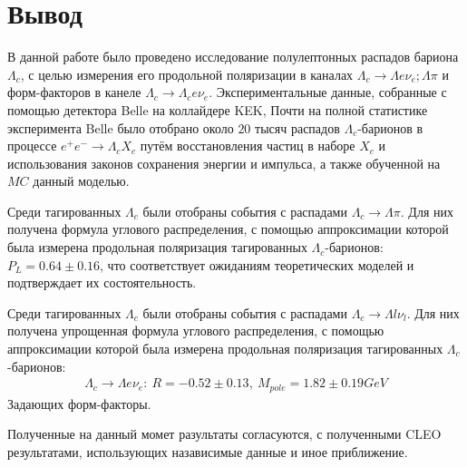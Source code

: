 \section{Вывод}

В данной работе было проведено исследование полулептонных распадов бариона $\Lambda_c$, 
с целью измерения его продольной поляризации в каналах $\Lambda_c \to \Lambda e \nu_e; \Lambda \pi$ 
и форм-факторов в канеле $\Lambda_c \to \Lambda_c e \nu_e$. 
Экспериментальные данные, собранные с помощью детектора Belle на коллайдере KEK, 
Почти на полной статистике эксперимента Belle было отобрано около
$20$ тысяч распадов $\Lambda_c$-барионов в процессе $e^+ e^- \to \Lambda_c X_c$ путём 
восстановления частиц в наборе $X_c$ и использования законов сохранения
энергии и импульса, а также обученной на $MC$ данный моделью.

Среди тагированных $\Lambda_c$ были отобраны события с распадами $\Lambda_c \to \Lambda \pi$. 
Для них получена формула углового распределения, с помощью аппроксимации которой была измерена
продольная поляризация тагированных $\Lambda_c$-барионов: $ P_L = 0.64\pm 0.16$,
что соответствует ожиданиям теоретических моделей и подтверждает их состоятельность.

Среди тагированных $\Lambda_c$ были отобраны события с распадами $\Lambda_c \to \Lambda l \nu_l$.
Для них получена упрощенная формула углового распределения, с помощью аппроксимации которой была измерена
продольная поляризация тагированных $\Lambda_c$-барионов:
\begin{eqnarray}
    \Lambda_c \to \Lambda e \nu_e: \ R = -0.52 \pm 0.13,\ M_{pole} = 1.82 ± 0.19 GeV
\end{eqnarray}
Задающих форм-факторы. 

Полученные на данный момет разультаты согласуются, с полученными CLEO результатами, использующих 
назависимые данные и иное приближение.